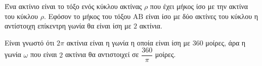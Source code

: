 \begin{alist}
\item Ένα ακτίνιο είναι το τόξο ενός κύκλου ακτίνας $\rho$ που έχει μήκος ίσο με την ακτίνα του κύκλου $\rho$. Εφόσον το μήκος του τόξου $\text{AB}$ είναι ίσο με δύο ακτίνες του κύκλου η αντίστοιχη επίκεντρη γωνία θα είναι ίση με $2$ ακτίνια.
\item Είναι γνωστό ότι $2\pi$ ακτίνια είναι η γωνία η οποία είναι ίση με $360$ μοίρες, άρα η γωνία $\omega$ που είναι $2$ ακτίνια θα αντιστοιχεί σε $\dfrac{360}{\pi}$ μοίρες.
\end{alist}

